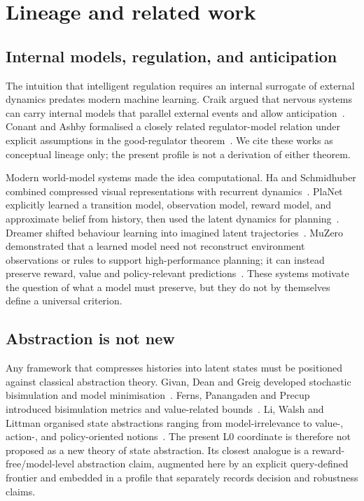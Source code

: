 \documentclass[10pt]{article}
\begin{document}
\section{Lineage and related work}

\subsection{Internal models, regulation, and anticipation}

The intuition that intelligent regulation requires an internal surrogate of external dynamics predates modern machine learning. Craik argued that nervous systems can carry internal models that parallel external events and allow anticipation~\cite{craik1943}. Conant and Ashby formalised a closely related regulator-model relation under explicit assumptions in the good-regulator theorem~\cite{conant1970}. We cite these works as conceptual lineage only; the present profile is not a derivation of either theorem.

Modern world-model systems made the idea computational. Ha and Schmidhuber combined compressed visual representations with recurrent dynamics~\cite{ha2018}. PlaNet explicitly learned a transition model, observation model, reward model, and approximate belief from history, then used the latent dynamics for planning~\cite{hafner2019}. Dreamer shifted behaviour learning into imagined latent trajectories~\cite{hafner2020}. MuZero demonstrated that a learned model need not reconstruct environment observations or rules to support high-performance planning; it can instead preserve reward, value and policy-relevant predictions~\cite{schrittwieser2020}. These systems motivate the question of what a model must preserve, but they do not by themselves define a universal criterion.

\subsection{Abstraction is not new}

Any framework that compresses histories into latent states must be positioned against classical abstraction theory. Givan, Dean and Greig developed stochastic bisimulation and model minimisation~\cite{givan2003}. Ferns, Panangaden and Precup introduced bisimulation metrics and value-related bounds~\cite{ferns2004}. Li, Walsh and Littman organised state abstractions ranging from model-irrelevance to value-, action-, and policy-oriented notions~\cite{li2006}. The present L0 coordinate is therefore not proposed as a new theory of state abstraction. Its closest analogue is a reward-free/model-level abstraction claim, augmented here by an explicit query-defined frontier and embedded in a profile that separately records decision and robustness claims.
\end{document}
